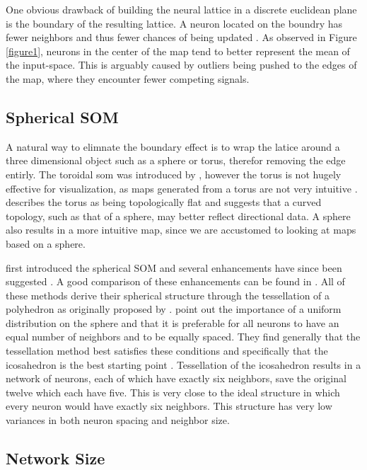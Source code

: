 \documentclass[11pt]{article}
\begin{document}
One obvious drawback of building the neural lattice in a discrete euclidean
plane is the boundary of the resulting lattice.  A neuron located on the boundry
has fewer neighbors and thus fewer chances of being updated \citep{wu2006}.  As
observed in Figure \ref{figure1}, neurons in the center of the map tend to
better represent the mean of the input-space.  This is arguably caused by
outliers being pushed to the edges of the map, where they encounter fewer
competing signals.

\subsection{Spherical SOM}
A natural way to elimnate the boundary effect is to wrap the latice around a
three dimensional object such as a sphere or torus, therefor removing the edge
entirly. The toroidal som was introduced by \cite{li1993}, however the torus
is not hugely effective for visualization, as maps generated from a torus are
not very intuitive \citep{ito2000,wu2006}.  \cite{ritter99} describes the
torus as being topologically flat and suggests that a curved topology, such as
that of a sphere, may better reflect directional data.  A sphere also results
in a more intuitive map, since we are accustomed to looking at maps based on a
sphere.

\cite{ritter99} first introduced the spherical SOM and several enhancements have
since been suggested \citep{boudjemai2003,sangole03,Nishio:2006fk,wu2006}.  A
good comparison of these enhancements can be found in \citep{wu2006}.  All of
these methods derive their spherical structure through the tessellation of a
polyhedron as originally proposed by \citeauthor{ritter99}.  \cite{wu2006} point
out the importance of a uniform distribution on the sphere and that it is
preferable for all neurons to have an equal number of neighbors and to be
equally spaced.  They find generally that the tessellation method best satisfies
these conditions and specifically that the icosahedron is the best starting
point \citep{wu2005}. Tessellation of the icosahedron results in a network of
neurons, each of which have exactly six neighbors, save the original twelve which
each have five.  This is very close to the ideal structure in which every neuron
would have exactly six neighbors.  This structure has very low variances in both
neuron spacing and neighbor size.  

\subsection{Network Size}
\end{document}
